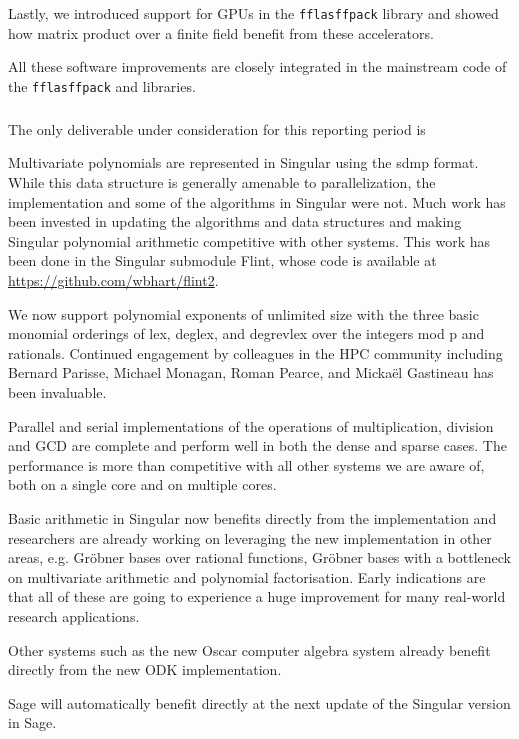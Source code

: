 Lastly, we introduced support for GPUs in the \texttt{fflasffpack} library and showed how matrix product over a finite
field benefit from these accelerators.

All these software improvements are closely integrated in the mainstream code of the \texttt{fflasffpack} and \Linbox libraries.

\medskip
\subparagraph{}
  \label{hpc@hpc-singular}

  The only deliverable under consideration for this reporting period
  is~

Multivariate polynomials are represented in Singular using the sdmp format. While this data structure is generally amenable to parallelization, the implementation and some of the algorithms in Singular were not. Much work has been invested in updating the algorithms and data structures and making Singular polynomial arithmetic competitive with other systems. This work has been done in the Singular submodule Flint, whose code is available at \url{https://github.com/wbhart/flint2}.

We now support polynomial exponents of unlimited size with the three basic monomial orderings of lex, deglex, and degrevlex over the integers mod p and rationals. Continued engagement by colleagues in the HPC community including Bernard Parisse, Michael Monagan, Roman Pearce, and Micka\"el Gastineau has been invaluable.

Parallel and serial implementations of the operations of multiplication, division and GCD are complete and perform well in both the dense and sparse cases. The performance is more than competitive with all other systems we are aware of, both on a single core and on multiple cores.

Basic arithmetic in Singular now benefits directly from the implementation and researchers are already working on leveraging the new implementation in other areas, e.g. Gr\"{o}bner bases over rational functions, Gr\"{o}bner bases with a bottleneck on multivariate arithmetic and polynomial factorisation. Early indications are that all of these are going to experience a huge improvement for many real-world research applications.

Other systems such as the new Oscar computer algebra system already benefit directly from the new ODK implementation. 

Sage will automatically benefit directly at the next update of the Singular version in Sage.

